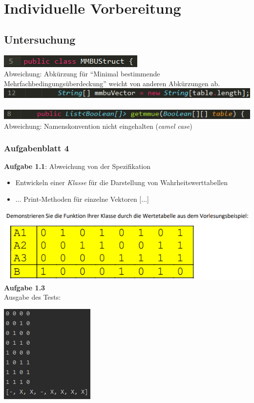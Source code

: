 \documentclass[11pt]{article}
\begin{document}
    \section{Individuelle Vorbereitung}

    \subsection{Untersuchung}
    \includegraphics{klassenkopf.PNG}\\
    Abweichung: Abk\"urzung f\"ur "`Minimal bestimmende Mehrfachbedingungs\"uberdeckung"' weicht von anderen Abk\"urzungen ab.\\
    \includegraphics{abkuerzung.PNG}\\~\\
    \includegraphics{camelcase.PNG}\\
    Abweichung: Namenskonvention nicht eingehalten (\textit{camel case})

    \subsubsection{Aufgabenblatt 4}
    \textbf{Aufgabe 1.1}: Abweichung von der Spezifikation
    \begin{itemize}
        \item Entwickeln einer \textit{Klasse} f\"ur die Darstellung von Wahrheitswerttabellen
        \item $\ldots$ Print-Methoden f\"ur einzelne Vektoren [$\ldots$]
    \end{itemize}
    \includegraphics{aufgabe_1_1.PNG}
    \newpage
    \textbf{Aufgabe 1.3}\\
    Ausgabe des Tests:
    \begin{center}
        \includegraphics{result.PNG}
    \end{center}
\end{document}
